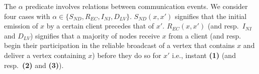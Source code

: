 The $\alpha$ predicate involves relations between communication events. 
We consider four cases with $\alpha \in \{S_{ND},R_{EC},I_{NI},D_{LV}\}$.
$S_{ND}(x,x')$ signifies that the initial emission of $x$ by a certain client precedes that of $x'$.
$R_{EC}(x,x')$ (and resp.~$I_{NI}$ and $D_{LV}$) signifies that a majority of nodes receive $x$ from a client (and resp.~ begin their participation in the reliable broadcast of a vertex that contains $x$ and deliver a vertex containing $x$) before they do so for $x'$ i.e., instant \textbf{(1)} (and resp.~\textbf{(2)} and \textbf{(3)}).





